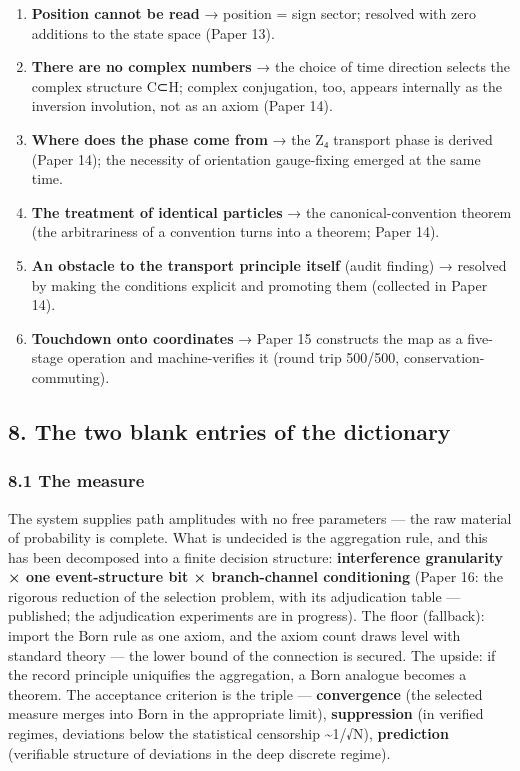 \documentclass[
]{article}
\providecommand{\tightlist}{%
  \setlength{\itemsep}{0pt}\setlength{\parskip}{0pt}}
\begin{document}
\begin{enumerate}
\def\labelenumi{\arabic{enumi}.}
\tightlist
\item
  \textbf{Position cannot be read} → position = sign sector; resolved
  with zero additions to the state space (Paper 13).
\item
  \textbf{There are no complex numbers} → the choice of time direction
  selects the complex structure C⊂H; complex conjugation, too, appears
  internally as the inversion involution, not as an axiom (Paper 14).
\item
  \textbf{Where does the phase come from} → the Z₄ transport phase is
  derived (Paper 14); the necessity of orientation gauge-fixing emerged
  at the same time.
\item
  \textbf{The treatment of identical particles} → the
  canonical-convention theorem (the arbitrariness of a convention turns
  into a theorem; Paper 14).
\item
  \textbf{An obstacle to the transport principle itself} (audit finding)
  → resolved by making the conditions explicit and promoting them
  (collected in Paper 14).
\item
  \textbf{Touchdown onto coordinates} → Paper 15 constructs the map as a
  five-stage operation and machine-verifies it (round trip 500/500,
  conservation-commuting).
\end{enumerate}

\subsection{8. The two blank entries of the
dictionary}\label{the-two-blank-entries-of-the-dictionary}

\subsubsection{8.1 The measure}\label{the-measure}

The system supplies path amplitudes with no free parameters --- the raw
material of probability is complete. What is undecided is the
aggregation rule, and this has been decomposed into a finite decision
structure: \textbf{interference granularity × one event-structure bit ×
branch-channel conditioning} (Paper 16: the rigorous reduction of the
selection problem, with its adjudication table --- published; the
adjudication experiments are in progress). The floor (fallback): import
the Born rule as one axiom, and the axiom count draws level with
standard theory --- the lower bound of the connection is secured. The
upside: if the record principle uniquifies the aggregation, a Born
analogue becomes a theorem. The acceptance criterion is the triple ---
\textbf{convergence} (the selected measure merges into Born in the
appropriate limit), \textbf{suppression} (in verified regimes,
deviations below the statistical censorship \textasciitilde1/√N),
\textbf{prediction} (verifiable structure of deviations in the deep
discrete regime).
\end{document}
